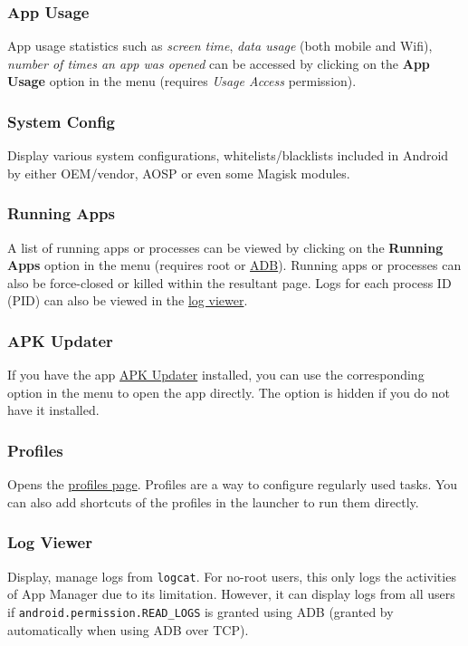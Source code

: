 \subsubsection{App Usage}
App usage statistics such as \textit{screen time}, \textit{data usage} (both mobile and Wifi), \textit{number of times
an app was opened} can be accessed by clicking on the \textbf{App Usage} option in the menu (requires \textit{Usage
Access} permission).

\subsubsection{System Config}
Display various system configurations, whitelists/blacklists included in Android by either OEM/vendor, AOSP or even some
Magisk modules.

\subsubsection{Running Apps}\label{subsubsec:main:running-apps}
A list of running apps or processes can be viewed by clicking on the \textbf{Running Apps} option in the menu (requires
root or \hyperref[sec:adb-over-tcp]{ADB}).
Running apps or processes can also be force-closed or killed within the resultant page.
Logs for each process ID (PID) can also be viewed in the \hyperref[subsubsec:log-viewer]{log viewer}.

\subsubsection{APK Updater}
If you have the app \href{https://github.com/rumboalla/apkupdater}{APK Updater} installed, you can use the corresponding
option in the menu to open the app directly.
The option is hidden if you do not have it installed.

\subsubsection{Profiles}
Opens the \hyperref[sec:profiles-page]{profiles page}.
Profiles are a way to configure regularly used tasks.
You can also add shortcuts of the profiles in the launcher to run them directly.

\subsubsection{Log Viewer}\label{subsubsec:log-viewer}
Display, manage logs from \texttt{logcat}.
For no-root users, this only logs the activities of App Manager due to its limitation.
However, it can display logs from all users if \texttt{android.permission.READ\_LOGS} is granted using ADB (granted by
automatically when using ADB over TCP).

